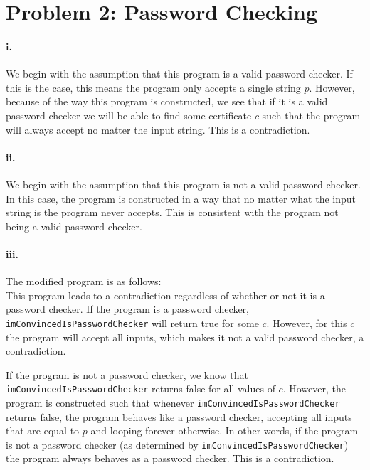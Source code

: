 \documentclass[10pt,letter]{article}
\begin{document}
\section*{Problem 2: Password Checking}

\paragraph{i.} We begin with the assumption that this program is a valid password checker. If this is the case, this means the program only accepts a single string $p$. However, because of the way this program is constructed, we see that if it is a valid password checker we will be able to find some certificate $c$ such that the program will always accept no matter the input string. This is a contradiction.

\paragraph{ii.} We begin with the assumption that this program is not a valid password checker. In this case, the program is constructed in a way that no matter what the input string is the program never accepts. This is consistent with the program not being a valid password checker.

\paragraph{iii.} The modified program is as follows:\\



This program leads to a contradiction regardless of whether or not it is a password checker. If the program is a password checker, \texttt{imConvincedIsPasswordChecker} will return true for some $c$. However, for this $c$ the program will accept all inputs, which makes it not a valid password checker, a contradiction. 

If the program is not a password checker, we know that \texttt{imConvincedIsPasswordChecker} returns false for all values of $c$. However, the program is constructed such that whenever \texttt{imConvincedIsPasswordChecker} returns false, the program behaves like a password checker, accepting all inputs that are equal to $p$ and looping forever otherwise. In other words, if the program is not a password checker (as determined by \texttt{imConvincedIsPasswordChecker}) the program always behaves as a password checker. This is a contradiction. 
\end{document}
